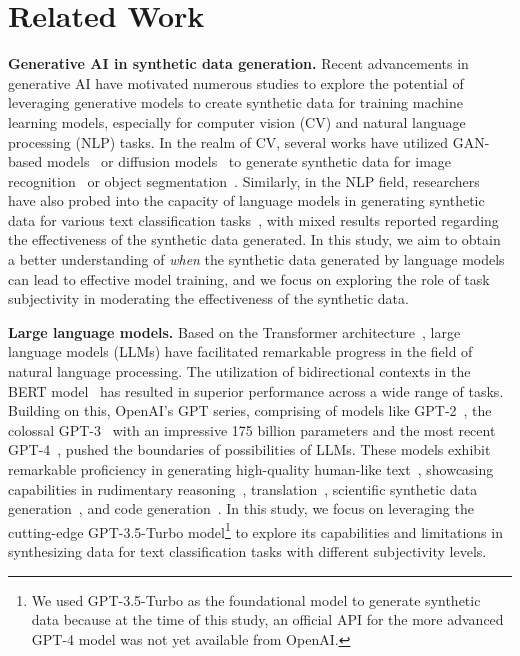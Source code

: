 \section{Related Work}
\noindent \textbf{Generative AI in synthetic data generation.} Recent advancements in generative AI have motivated numerous studies to explore the potential of leveraging generative models to create synthetic data for training machine learning models, especially for computer vision (CV) and natural language processing (NLP) tasks. In the realm of CV, several works have utilized GAN-based models~\cite{karras2019style} or diffusion models~\cite{nichol2021glide} to generate synthetic data for image recognition~\cite{besnier2020dataset,he2022synthetic} or object segmentation~\cite{zhang2021datasetgan}. Similarly, in the NLP field, researchers have also probed into the capacity of language models in generating synthetic data for various text classification tasks~\cite{kumar2020data,chung2023increasing, sahu2022data, yoo2021gpt3mix, ye2022zerogen,wang2021towards,hartvigsen2022toxigen,meng2022generating,gao2022self,aggarwal2022entity, chen2022weakly}, with mixed results reported regarding the effectiveness of the synthetic data generated.  
In this study, we aim to obtain a better understanding of {\em when} the synthetic data generated by language models can lead to effective model training, and we focus on exploring the role of task subjectivity in moderating the effectiveness of the synthetic data.  

\noindent \textbf{Large language models.}
Based on the Transformer architecture~\cite{vaswani2017attention}, large language models (LLMs) have facilitated remarkable progress in the field of natural language processing. The utilization of bidirectional contexts in the BERT model~\cite{devlin2018bert} has resulted in superior performance across a wide range of tasks. Building on this, OpenAI's GPT series, comprising of models like GPT-2~\cite{radford2019language}, the colossal GPT-3~\cite{brown2020language} with an impressive 175 billion parameters and the most recent GPT-4~\cite{openai2023gpt4}, pushed the boundaries of possibilities of LLMs. These models exhibit remarkable proficiency in generating high-quality human-like text~\cite{clark2021all,dou2021gpt,10.1145/3544548.3581318}, showcasing capabilities in rudimentary reasoning~\cite{wei2021finetuned}, translation~\cite{brown2020language}, scientific synthetic data generation~\cite{10.1145/3544548.3580688}, and code generation~\cite{10.1145/3544548.3580940}.  
In this study, we focus on leveraging the cutting-edge GPT-3.5-Turbo model\footnote{We used GPT-3.5-Turbo as the foundational model to generate synthetic data because at the time of this study, an official API for the more advanced GPT-4 model was not yet available from OpenAI.} to explore its capabilities and limitations in synthesizing data for text classification tasks with different subjectivity levels.


